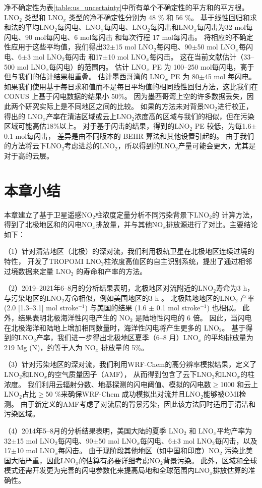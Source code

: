 净不确定性为表\ref{table:us_uncertainty}中所有单个不确定性的平方和的平方根。
LNO$_2$ 类型和 LNO$_x$ 类型的净不确定性分别为 48 \% 和 56 \%。
基于线性回归和求和法的平均LNO$_2$每闪电、LNO$_x$每闪电、LNO$_2$每闪击和LNO$_x$每闪击为32 mol每闪电、90 mol每闪电、6 mol每闪击 和每次行程 17 mol每闪击。
将相应的不确定性应用于这些平均值，我们得出32$\pm$15 mol LNO$_2$每闪电、90$\pm$50 mol LNO$_x$每闪电、6$\pm$3 mol LNO$_2$每闪击 和17$\pm$10 mol LNO$_x$每闪击。
这在当前文献估计（33--500 mol LNO$_x$每闪电）的范围内\citep{Schumann.2007,Beirle.2010,Bucsela.2010}。
\citet{Bucsela.2010}估计 LNO$_x$ PE 为 100--250 mol每闪电，高于但与我们的估计结果相重叠。
\citet{Pickering.2016}估计墨西哥湾的 LNO$_x$ PE 为 80$\pm$45 mol 每闪电。
如果我们使用基于每日求和值而不是每日平均值的相同线性回归方法，这比我们在 CONUS 上基于闪电数据的结果小 50\%。
因为墨西哥湾上空的许多数据丢失，因此两个研究实际上是不同地区之间的比较。
如果\citet{Pickering.2016}的方法未对背景NO$_2$进行校正，得出的 LNO$_x$产率在清洁区域或云上LNO$_2$浓度高的区域与我们的相似，但在污染区域可能高估18\%以上。
对于基于闪击的结果，\citet{Lapierre.2020}得到的LNO$_2$ PE 较低，为每1.6$\pm$0.1 mol每闪击，
差异是由不同版本的 BEHR 算法和其他设置引起的。
由于我们的方法将云下LNO$_2$考虑进总的LNO$_2$，所以得到的LNO$_2$产量可能会更大，尤其是对于高的云层。


\section{本章小结}

本章建立了基于卫星遥感NO$_2$柱浓度定量分析不同污染背景下LNO$_2$的
计算方法，得到了北极地区和的闪电NO$_x$排放量，并与其他NO$_x$排放源进行了对比。主要结论如下：

（1）针对清洁地区（北极）的深对流，我们利用极轨卫星在北极地区连续过境的特性，
开发了TROPOMI LNO$_2$柱浓度高值区的自主识别系统，提出了通过相邻过境数据来定量 LNO$_2$ 的寿命和产率的方法。

（2）2019--2021年6--8月的分析结果表明，北极地区对流附近的LNO$_2$寿命为3 h，与污染地区的LNO$_2$寿命相似，例如美国地区的3 h \citep{Nault.2017}。
北极陆地地区的LNO$_2$ 产率 (2.0 [1.3--3.1] mol stroke$^{-1}$) 与美国的结果 (1.6 $\pm$ 0.1 mol stroke$^{-1}$) 也相似\citep{Lapierre.2020}。
此外，结果表明北极海洋性闪电产生的 NO$_2$ 是陆地性闪电的 6 倍。
因此，当闪电在北极海洋和陆地上增加相同数量时，海洋性闪电将产生更多的 LNO$_2$。
基于得到的LNO$_2$产率，我们进一步得出北极地区夏季（6--8 月）LNO$_x$ 的平均排放量为219 Mg (N)，约等于人为 NO$_x$ 排放量的 5\%。

（3）针对污染地区的深对流，我们利用WRF-Chem的高分辨率模拟结果，定义了LNO$_2$和LNO$_x$的空气质量因子（AMF），
从而得到包含了云下LNO$_2$和LNO$_x$的柱浓度。
我们利用云辐射分数、地基探测的闪电阈值、模拟的闪电数$\geq$1000 和云上LNO$_2$占比$\geq$50 \%来确保WRF-Chem 成功模拟出对流并且LNO$_2$能够被OMI检测。
由于新定义的AMF考虑了对流层的背景污染，因此该方法同时适用于清洁和污染区域。

（4）2014年5--8月的分析结果表明，美国大陆的夏季 LNO$_2$ 和 LNO$_x$平均产率为32$\pm$15 mol LNO$_2$每闪电、90$\pm$50 mol LNO$_x$每闪电、6$\pm$3 mol LNO$_2$每闪击，以及17$\pm$10 mol LNO$_x$每闪击。
由于现阶段其他地区（如中国和印度）NO$_2$ 污染比美国大陆严重，因此LNO$_x$的估算有必要详细考虑NO$_2$背景污染。
此外，区域和全球模式还需开发更为完善的闪电参数化来提高局地和全球范围内LNO$_x$排放估算的准确性。

